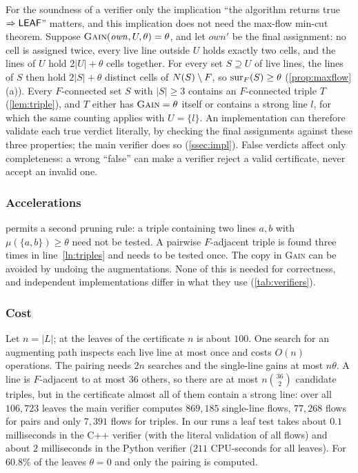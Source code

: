 \begin{remark}\label{rem:true-cert}
For the soundness of a verifier only the implication ``the algorithm returns true $\Rightarrow\mathsf{LEAF}$''
matters, and this implication does not need the max-flow min-cut theorem. Suppose
$\textsc{Gain}(\mathit{own},U,\theta)=\theta$, and let $\mathit{own}'$ be the final assignment: no cell is
assigned twice, every live line outside $U$ holds exactly two cells, and the lines of $U$ hold $2|U|+\theta$
cells together. For every set $S\supseteq U$ of live lines, the lines of $S$ then hold $2|S|+\theta$
distinct cells of $N(S)\setminus F$, so $\operatorname{sur}_F(S)\ge\theta$ (\cref{prop:maxflow}\,(a)). Every $F$-connected
set $S$ with $|S|\ge3$ contains an $F$-connected triple $T$ (\cref{lem:triple}), and $T$ either has
$\textsc{Gain}=\theta$ itself or contains a strong line $l$, for which the same counting applies with
$U=\{l\}$. An implementation can therefore validate each true verdict literally, by checking the final
assignments against these three properties; the main verifier does so (\cref{ssec:impl}). False verdicts
affect only completeness: a wrong ``false'' can make a verifier reject a valid certificate, never accept
an invalid one.
\end{remark}

\subsubsection*{Accelerations}
 permits a second pruning rule: a triple containing two lines $a,b$ with
$\mu(\{a,b\})\ge\theta$ need not be tested. A pairwise $F$-adjacent triple is found three times in
line~\ref{ln:triples} and needs to be tested once. The copy in \textsc{Gain} can be avoided by undoing
the augmentations. None of this is needed for correctness, and independent implementations differ in what they use
(\cref{tab:verifiers}).

\subsubsection*{Cost}
Let $n=|L|$; at the leaves of the certificate $n$ is about $100$. One search for an augmenting path
inspects each live line at most once and costs $O(n)$ operations. The pairing needs $2n$ searches and the
single-line gains at most $n\theta$. A line is $F$-adjacent to at most $36$ others, so there are at most
$n\binom{36}{2}$ candidate triples, but in the certificate almost all of them contain a strong line: over
all $106{,}723$ leaves the main verifier computes $869{,}185$ single-line flows, $77{,}268$ flows for pairs
and only $7{,}391$ flows for triples. In our runs a leaf test takes about $0.1$ milliseconds in the C++
verifier (with the literal validation of all flows) and about $2$ milliseconds in the Python verifier
($211$ CPU-seconds for all leaves). For $60.8\%$ of the leaves $\theta=0$ and only the pairing is
computed.


